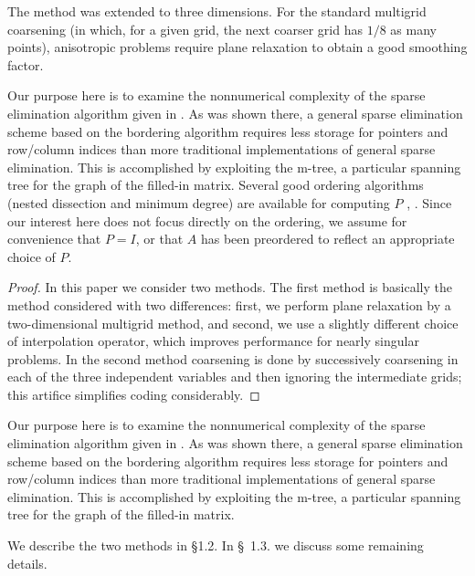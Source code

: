\documentclass[twoside,leqno,twocolumn]{article}
\begin{document}
\begin{theorem} The method  was extended to three
dimensions. For the standard multigrid
coarsening
(in which, for a given grid, the next coarser grid has $1/8$
as many points), anisotropic problems require plane
relaxation to
obtain a good smoothing factor.\end{theorem}

Our purpose here is to examine the nonnumerical complexity of the
sparse elimination algorithm given in  \cite{BANKSMITH}.
As was shown there, a general sparse elimination scheme based on the
bordering algorithm requires less storage for pointers and
row/column indices than more traditional implementations of general
sparse elimination.  This is accomplished by exploiting the m-tree,
a particular spanning tree for the graph of the filled-in matrix.
Several good ordering algorithms (nested dissection and minimum degree)
are available for computing $P$  \cite{GEORGELIU}, \cite{ROSE72}.
Since our interest here does not
focus directly on the ordering, we assume for convenience that $P=I$,
or that $A$ has been preordered to reflect an appropriate choice of $P$.

\begin{proof} In this paper we consider two methods. The first method
is
basically the method considered with two differences:
first, we perform plane relaxation by a two-dimensional
multigrid method, and second, we use a slightly different
choice of
interpolation operator, which improves performance
for nearly singular problems. In the second method coarsening
is done by successively coarsening in each of the three
independent variables and then ignoring the intermediate
grids; this artifice simplifies coding considerably.
\end{proof}

Our purpose here is to examine the nonnumerical complexity of the
sparse elimination algorithm given in  \cite{BANKSMITH}.
As was shown there, a general sparse elimination scheme based on the
bordering algorithm requires less storage for pointers and
row/column indices than more traditional implementations of general
sparse elimination.  This is accomplished by exploiting the m-tree,
a particular spanning tree for the graph of the filled-in matrix.

\begin{Definition}{\rm We describe the two methods in \S 1.2. In \S\ 1.3. we
discuss
some remaining details.}
\end{Definition}
\end{document}
